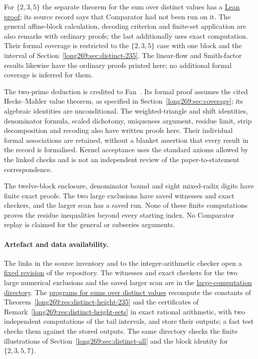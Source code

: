 \documentclass[11pt]{article}
\theoremstyle{remark}
\theoremstyle{plain}
\newcommand{\distinctheighturl}{https://github.com/wcook04/plectis-erdos/tree/10178c4df40cb27d83b5ebb1ec337dd588b82998/research/experiments/erdos269/distinct_height}
\newcommand{\distinctheightlean}{https://github.com/wcook04/plectis-erdos/blob/5154f4c46fa5d5ab2cff8df857a0b10f310cbeeb/lean/ErdosProblems/Erdos269/DistinctHeightIrrationality.lean}
\begin{document}
For $\{2,3,5\}$ the separate theorem for the sum over distinct values has a
\href{\distinctheightlean\#L689}{Lean proof}; its source record says
that Comparator had not been run on it. The general affine-block calculation,
decoding criterion and finite-set application are also remarks with
ordinary proofs; the last additionally uses exact computation. Their
formal coverage is restricted to the $\{2,3,5\}$ case with one block
and the interval of Section~\ref{long269:sec:distinct-235}.
The linear-flow and Smith-factor results likewise have the ordinary
proofs printed here; no additional formal coverage is inferred for them.

The two-prime deduction is credited to Fan~\cite{fan2026comment}.
Its formal proof assumes the cited Hecke--Mahler value theorem, as specified
in Section~\ref{long269:sec:coverage}; its algebraic identities are
unconditional. The weighted-triangle and shift identities, denominator
formula, scaled dichotomy, uniqueness argument, residue limit, strip
decomposition and recoding also have written proofs here. Their individual
formal associations are retained, without a blanket assertion that every
result in the record is formalised. Kernel acceptance uses the standard
axioms allowed by the linked checks and is not an independent review of
the paper-to-statement correspondence.

The twelve-block enclosure, denominator bound and eight mixed-radix digits
have finite exact proofs. The two large exclusions have saved witnesses
and exact checkers, and the larger scan has a saved run. None of these
finite computations proves the residue inequalities beyond every starting
index. No Comparator replay is claimed for the general or subseries
arguments.

\paragraph{Artefact and data availability.} The links in the
source inventory and to the integer-arithmetic checker open a
\href{\sourceurl}{fixed revision} of the repository.  The
witnesses and exact checkers for the two large numerical exclusions and
the saved larger scan are in the
\href{https://github.com/wcook04/plectis-erdos/tree/f757115e03bebe5c04431a147da559015c680a37/research/experiments/erdos269/large-computations}{large-computation directory}.
The \href{\distinctheighturl}{programs for sums over distinct values} recompute the
constants of Theorem~\ref{long269:res:distinct-height-235} and the
certificates of Remark~\ref{long269:res:distinct-height-sets} in exact
rational arithmetic, with two independent computations of the tail
intervals, and store their outputs; a fast test checks them against the
stored outputs.  The same directory checks the finite illustrations of
Section~\ref{long269:sec:distinct-all} and the block identity for
$\{2,3,5,7\}$.
\end{document}
